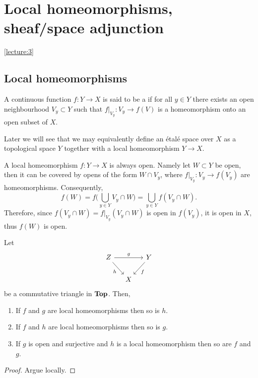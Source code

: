 \documentclass[../main.tex]{subfiles}
\begin{document}

\chapter{Local homeomorphisms, sheaf/space adjunction}\cref{lecture:3}

\section{Local homeomorphisms}
\noindent

\begin{defn}
    A continuous function $f\colon Y\to X$ is said to be a  if for all $y\in Y$ there exists an open neighbourhood $V_y\subset Y$ such that $f|_{V_y}\colon V_y\to f(V)$ is a homeomorphism onto an open subset of $X$. 
\end{defn}

Later we will see that we may equivalently define an étalé space over $X$ as a topological space $Y$ together with a local homeomorphism $Y\to X$. 
\begin{rmk}
    A local homeomorphism $f\colon Y\to X$ is always open. Namely let $W\subset Y$ be open, then it can be covered by opens of the form $W\cap V_y$, where $f|_{V_y}\colon V_y \to f(V_y)$ are homeomorphisms. Consequently,
\[f(W) = f\bigl(\bigcup_{y\in Y} V_y\cap W \bigr) = \bigcup_{y\in Y} f(V_y\cap W)\text{.}\] Therefore, since $f(V_y\cap W) = f|_{V_y}(V_y\cap W)$ is open in $f(V_y)$, it is open in $X$, thus $f(W)$ is open.
\end{rmk}

\begin{lem}\label{lem:localhomtriangle}
    Let
    \[\begin{tikzcd}[column sep=small]
    Z \arrow[rr, "g"] \arrow[rd, "h"'] &   & Y \arrow[ld, "f"] \\
                                       & X &                  
    \end{tikzcd}\]
    be a commutative triangle in $\mathbf{Top}$. Then,
    \begin{enumerate}
        \item\label{lem:localhomtriangle:f-g} If $f$ and $g$ are local homeomorphisms then so is $h$.
        \item\label{lem:localhomtriangle:f-h} If $f$ and $h$ are local homeomorphisms then so is $g$.
        \item\label{lem:localhomtriangle:g-open-surj-h} If $g$ is open and surjective and $h$ is a local homeomorphism then so are $f$ and $g$.
    \end{enumerate}
\end{lem}
\begin{proof}
    Argue locally. 
\end{proof}
\end{document}
